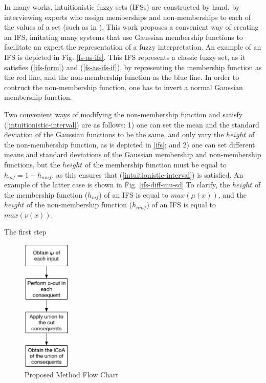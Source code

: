 \documentclass[conference]{IEEEtran}
\begin{document}
In many works, intuitionistic fuzzy sets (IFSs) are constructed by
hand, by interviewing experts who assign memberships and
non-memberships to each of the values of a set (such as in
\cite{davarzani2013novel}). This work proposes a convenient way of
creating an IFS, imitating many systems that use Gaussian
membership functions to facilitate an expert the representation of a
fuzzy interpretation. An example of an IFS is depicted in
Fig. \ref{fs-as-ifs}. This IFS represents a classic fuzzy set, as it
satisfies (\ref{ifs-form}) and (\ref{fs-as-ifs-if}), by representing
the membership function as the red line, and the non-membership
function as the blue line. In order to contruct the non-membership
function, one has to invert a normal Gaussian membership function.

Two convenient ways of modifying the non-membership function and
satisfy (\ref{intuitionistic-interval}) are as follows: 1) one can set
the mean and the standard deviation of the Gaussian functions to be
the same, and only vary the $height$ of the non-membership function,
as is depicted in \ref{ifs}; and 2) one can set different means and
standard deviations of the Gaussian membership and non-membership
functions, but the $height$ of the membership function must be equal
to $h_{mf} = 1 - h_{nmf}$, as this ensures that
(\ref{intuitionistic-interval}) is satisfied. An example of the latter
case is shown in Fig. \ref{ifs-diff-mu-sd}.To clarify, the $height$
of the membership function ($h_{mf}$) of an IFS is equal to
$max(\mu(x))$, and the $height$ of the non-membership function
($h_{nmf}$) of an IFS is equal to $max(\nu(x))$.

The first step 





\begin{figure}[!t]
  \centering
  \includegraphics[height=2.5in]{proposed-method-flow-chart}
  \caption{Proposed Method Flow Chart}
  \label{flow-chart}
\end{figure}
\end{document}
